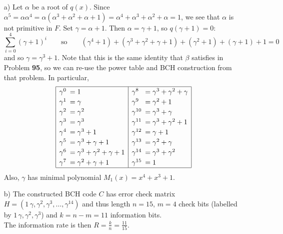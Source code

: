 \documentclass[11pt]{article}
\begin{document}
\medskip
{}
\begin{itemize}
  \item[a)] Let $\alpha$ be a root of $q(x)$.
    Since $\alpha^5 = \alpha\alpha^4
                    = \alpha(\alpha^3 + \alpha^2 + \alpha + 1)
                    = \alpha^4 + \alpha^3 + \alpha^2 + \alpha
                    = 1$,
    we see that $\alpha$ is not primitive in $F$.
    Set  $\gamma = \alpha + 1$.
    Then $\alpha = \gamma + 1$,
    so $q(\gamma+1) = 0$:
    \[
      \sum_{i=0}^4(\gamma+1)^i\qquad\text{so}\qquad
      (\gamma^4 + 1) + (\gamma^3+\gamma^2+\gamma+1) + (\gamma^2+1) + (\gamma + 1) + 1
      = 0
    \]
    and so $\gamma = \gamma^3 + 1$.
    Note that this is the same identity that $\beta$ satisfies in Problem {\bf 95},
    so we can re-use the power table and BCH construction from that problem.
    In particular,
  \[{\renewcommand*{\arraystretch}{1.2}
    \begin{array}{|ll|ll|}\hline
     \gamma^0 \!\!\!&= 1                             & \gamma^8   \!\!\!&= \gamma^3 + \gamma^2 + \gamma \\
     \gamma^1 \!\!\!&= \gamma                         & \gamma^9   \!\!\!&= \gamma^2 + 1\\
     \gamma^2 \!\!\!&= \gamma^2                       & \gamma^{10}\!\!\!&= \gamma^3 + \gamma\\
     \gamma^3 \!\!\!&= \gamma^3                       & \gamma^{11}\!\!\!&= \gamma^3 + \gamma^2 + 1\\
    \gamma^4 \!\!\!&= \gamma^3 + 1                   & \gamma^{12}\!\!\!&= \gamma   + 1\\
    \gamma^5 \!\!\!&= \gamma^3 + \gamma + 1           & \gamma^{13}\!\!\!&= \gamma^2 + \gamma\\
    \gamma^6 \!\!\!&= \gamma^3 + \gamma^2 + \gamma + 1 & \gamma^{14}\!\!\!&= \gamma^3 + \gamma^2\\
    \gamma^7 \!\!\!&= \gamma^2 + \gamma + 1           & \gamma^{15}\!\!\!&= 1\\\hline
  \end{array}}\]
  Also, $\gamma$ has minimal polynomial $M_1(x) = x^4 + x^3 + 1$.
  \item[b)] The constructed BCH code $C$ has
            error check matrix $H = (1\,\gamma,\gamma^2,\gamma^3,\ldots,\gamma^{14})$
            and thus length $n = 15$, $m = 4$ check bits (labelled by $1\,\gamma,\gamma^2,\gamma^3$)
            and $k = n - m = 11$ information bits.\\
            The information rate is then $R = \frac{k}{n} = \frac{11}{15}$.

\end{itemize}
\end{document}
